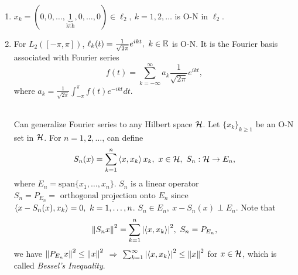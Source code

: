 \begin{examples}\
\begin{enumerate}[label = (\alph*)]
    \item $x_k = (0,0,\dots,\underbrace{1}_{\text{kth}},0,\dots,0) \in \ell_2,\ k = 1,2,\dots$ is O-N in $\ell_2$.
    \item For $L_2([-\pi,\pi])$, $\ell_k (t) = \frac{1}{\sqrt{2\pi}} e^{ikt},\ k \in \E$ is O-N. It is the Fourier basis associated with Fourier series 
    $$f(t) = \sum_{k =-\infty}^\infty a_k \frac{1}{\sqrt{2\pi}} e^{ikt},$$
    where $a_k = \frac{1}{\sqrt{2\pi}} \int_{-\pi}^\pi f(t) e^{-ikt} dt$.
    \begin{remark}\ \\
    Can generalize Fourier series to any Hilbert space $\mathcal{H}$. Let $\{x_k\}_{k \geq 1}$ be an O-N set in $\mathcal{H}$. For $n = 1,2,\dots$, can define 
    $$S_n(x) = \sum_{k = 1}^n \left\langle x, x_k \right\rangle x_k,\ x \in \mathcal{H},\ S_n: \mathcal{H} \to E_n,$$
    where $E_n = \text{span}\{x_1,\dots,x_n\}$. $S_n$ is a linear operator $S_n = P_{E_n} = \underline{\text{ orthogonal projection onto } E_n}$ since $\left\langle x - S_n(x), x_k \right\rangle = 0,\ k = 1,\dots,n$. $S_n \in E_n,\ x - S_n(x) \perp E_n$. Note that
    $$\norm{S_n x}^2 = \sum_{k=1}^n \abs{\left\langle x, x_k \right\rangle}^2,\ S_n = P_{E_n},$$ 
    we have $\norm{P_{E_n}x}^2 \leq \norm{x}^2$ $\Rightarrow$ $\sum_{k = 1}^\infty \abs{\left\langle x, x_k \right\rangle}^2 \leq \norm{x}^2$ for $x \in \mathcal{H}$, which is called \textit{Bessel's Inequality}.
    \end{remark}
\end{enumerate}
\end{examples}

